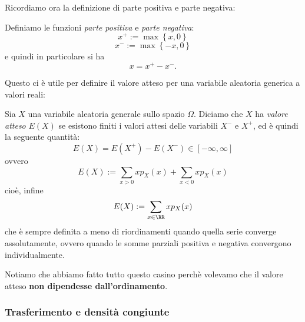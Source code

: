 \documentclass[11pt]{scrartcl}
\begin{document}
	Ricordiamo ora la definizione di parte positiva e parte negativa:
	\begin{definition}
		Definiamo le funzioni \textit{parte positiva} e \textit{parte negativa}:
		$$x^+:=\max\left\{x,0\right\}$$
		$$x^-:=\max\left\{-x,0\right\}$$
		e quindi in particolare si ha
		$$x=x^+-x^-.$$
	\end{definition}
	Questo ci è utile per definire il valore atteso per una variabile aleatoria generica a valori reali:
	\begin{definition}
		Sia $X$ una variabile aleatoria generale sullo spazio $\Omega$. Diciamo che $X$ ha \textit{valore atteso} $E(X)$ se esistono finiti i valori attesi delle variabili $X^-$ e $X^+$, ed è quindi la seguente quantità:
		$$E(X)=E(X^+)-E(X^-)\in [-\infty,\infty]$$
		ovvero
		$$E(X):=\sum_{x>0}xp_X(x)+\sum_{x<0}xp_X(x)$$
		cioè, infine
		$$E(X):=\sum_{x\in\RR}xp_X(x)$$
		che è sempre definita a meno di riordinamenti quando quella serie converge assolutamente, ovvero quando le somme parziali positiva e negativa convergono individualmente.
	\end{definition}
	Notiamo che abbiamo fatto tutto questo casino perchè volevamo che il valore atteso \textbf{non dipendesse dall'ordinamento}.
	\subsubsection{Trasferimento e densità congiunte}
	
\end{document}
